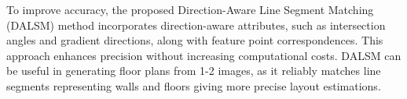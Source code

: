 To improve accuracy, the proposed Direction-Aware Line Segment Matching (DALSM) method incorporates direction-aware attributes, such as intersection angles and gradient directions, along with feature point correspondences. 
This approach enhances precision without increasing computational costs. 
DALSM can be useful in generating floor plans from 1-2 images, as it reliably matches line segments representing walls and floors giving more precise layout estimations.